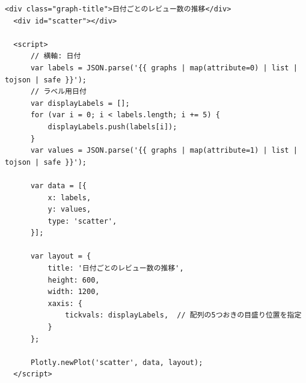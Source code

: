 \begin{lstlisting}[caption=detail.html, label=graph]
  <div class="graph-title">日付ごとのレビュー数の推移</div>
  <div id="scatter"></div>

  <script>
      // 横軸: 日付
      var labels = JSON.parse('{{ graphs | map(attribute=0) | list | tojson | safe }}');
      // ラベル用日付
      var displayLabels = [];
      for (var i = 0; i < labels.length; i += 5) {
          displayLabels.push(labels[i]);
      }
      var values = JSON.parse('{{ graphs | map(attribute=1) | list | tojson | safe }}');

      var data = [{
          x: labels,
          y: values,
          type: 'scatter',
      }];

      var layout = {
          title: '日付ごとのレビュー数の推移',
          height: 600,
          width: 1200,
          xaxis: {
              tickvals: displayLabels,  // 配列の5つおきの目盛り位置を指定
          }
      };

      Plotly.newPlot('scatter', data, layout);
  </script>
\end{lstlisting}


